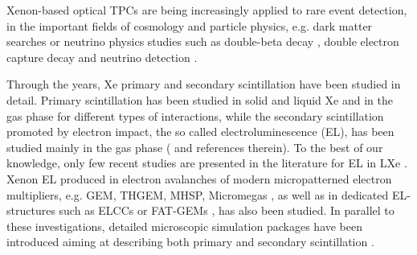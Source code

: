 \documentclass[%
 reprint,
superscriptaddress,
 amsmath,amssymb,
 aps,
]{revtex4-2}
\begin{document}
Xenon-based optical TPCs are being increasingly applied to rare event detection, in the important fields of cosmology and particle physics, e.g. dark matter searches \cite{1,2,3,4,5} or neutrino physics studies such as double-beta decay
\cite{6,7,8,9,10}, double electron capture decay \cite{11} and neutrino detection \cite{12,13}.
 
Through the years, Xe primary and secondary scintillation have been studied in detail. Primary scintillation has been studied in solid and liquid Xe \cite{14,15,16,17,18,18a} and in the gas phase \cite{21,22,23,19,20} for different types of interactions, while the secondary scintillation promoted by electron impact, the so called electroluminescence (EL), has been studied mainly in the gas phase (\cite{24,25,44,38} and references therein). To the best of our knowledge, only few recent studies are presented in the literature for EL in LXe \cite{26,27}. Xenon EL produced in electron avalanches of modern micropatterned electron multipliers, e.g. GEM, THGEM, MHSP, Micromegas \cite{28,29,30}, as well as in dedicated EL-structures such as ELCCs or FAT-GEMs \cite{30a,30b}, has also been studied. In parallel to these investigations, detailed microscopic simulation packages have been introduced aiming at describing both primary and secondary scintillation \cite{31,32}. 
\end{document}
